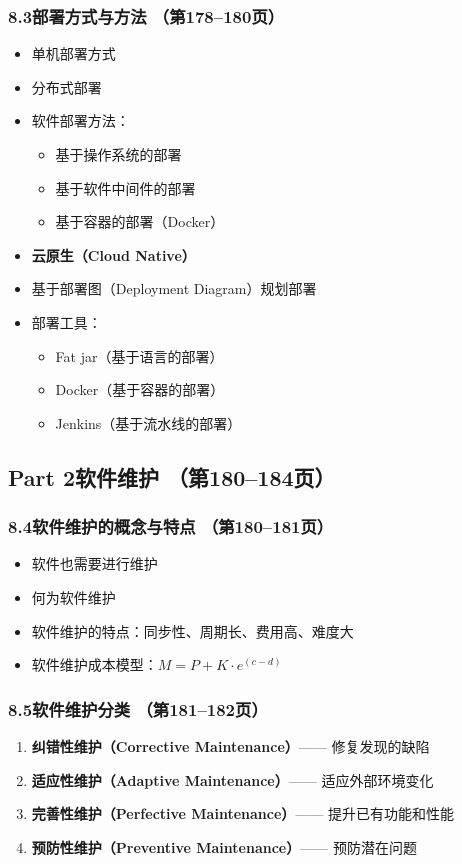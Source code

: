 \documentclass[12pt,a4paper]{ctexart}
\begin{document}
\subsubsection{8.3\quad 部署方式与方法 \hfill（第178--180页）}
\begin{itemize}
    \item 单机部署方式
    \item 分布式部署
    \item 软件部署方法：
    \begin{itemize}
        \item 基于操作系统的部署
        \item 基于软件中间件的部署
        \item 基于容器的部署（Docker）
    \end{itemize}
    \item \textbf{云原生（Cloud Native）}
    \item 基于部署图（Deployment Diagram）规划部署
    \item 部署工具：
    \begin{itemize}
        \item Fat jar（基于语言的部署）
        \item Docker（基于容器的部署）
        \item Jenkins（基于流水线的部署）
    \end{itemize}
\end{itemize}

\subsection{Part 2\quad 软件维护 \hfill（第180--184页）}

\subsubsection{8.4\quad 软件维护的概念与特点 \hfill（第180--181页）}
\begin{itemize}
    \item 软件也需要进行维护
    \item 何为软件维护
    \item 软件维护的特点：同步性、周期长、费用高、难度大
    \item 软件维护成本模型：$M = P + K \cdot e^{(c-d)}$
\end{itemize}

\subsubsection{8.5\quad 软件维护分类 \hfill（第181--182页）}
\begin{enumerate}
    \item \textbf{纠错性维护（Corrective Maintenance）}—— 修复发现的缺陷
    \item \textbf{适应性维护（Adaptive Maintenance）}—— 适应外部环境变化
    \item \textbf{完善性维护（Perfective Maintenance）}—— 提升已有功能和性能
    \item \textbf{预防性维护（Preventive Maintenance）}—— 预防潜在问题
\end{enumerate}
\end{document}
